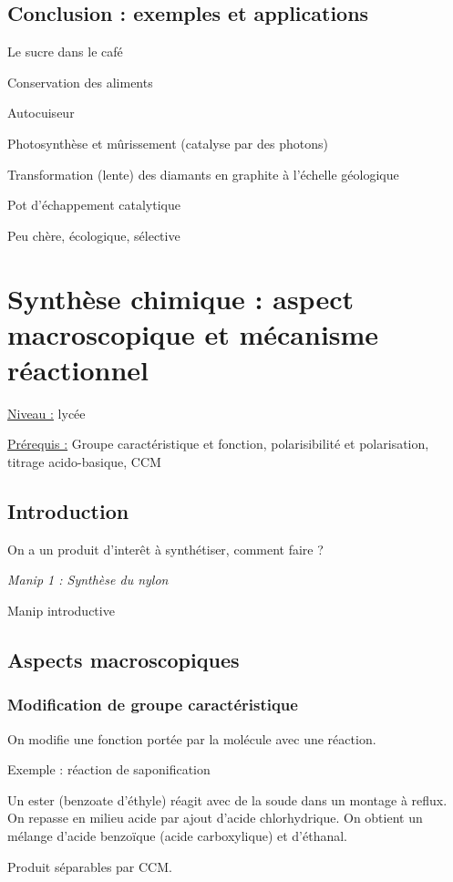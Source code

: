 \documentclass{article}%
\begin{document}
\subsection{Conclusion : exemples et applications}

Le sucre dans le café

Conservation des aliments

Autocuiseur

Photosynthèse et mûrissement (catalyse par des photons)

Transformation (lente) des diamants en graphite à l’échelle géologique

Pot d’échappement catalytique

Peu chère, écologique, sélective


\section{Synthèse chimique : aspect macroscopique et mécanisme réactionnel}
\underline{Niveau :} lycée

\underline{Prérequis :} Groupe caractéristique et fonction, polarisibilité et polarisation, titrage acido-basique, CCM

\subsection{Introduction}

On a un produit d'interêt à synthétiser, comment faire ?

\textit{Manip 1 : Synthèse du nylon}

Manip introductive
\subsection{Aspects macroscopiques}
\subsubsection{Modification de groupe caractéristique}

On modifie une fonction portée par la molécule avec une réaction. 

Exemple : réaction de saponification

Un ester (benzoate d'éthyle) réagit avec de la soude dans un montage à reflux. On repasse en milieu acide par ajout d'acide chlorhydrique. On obtient un mélange d'acide benzoïque (acide carboxylique) et d'éthanal.

Produit séparables par CCM.
\end{document}
